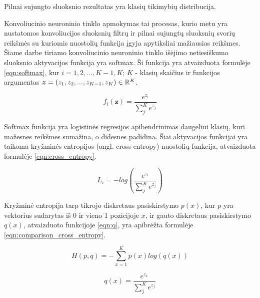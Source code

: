 Pilnai sujungto sluoksnio rezultatas yra klasių tikimybių distribucija.

Konvoliucinio neuroninio tinklo apmokymas tai procesas, kurio metu yra nustatomos konvoliucijos sluoksnių filtrų ir pilnai sujungtų sluoksnių svorių reikšmės su kuriomis nuostolių funkcija įgyja apytiksliai mažiausias reikšmes. Šiame darbe tiriamo konvoliucinio neuroninio tinklo išėjimo netiesiškumo sluoksnio aktyvacijos funkcija yra softmax. Ši funkcija yra atvaizduota formulėje \ref{eqn:softmax}, kur $i = 1, 2, ..., K - 1, K$; $K$ - klasių skaičius ir funkcijos argumentas $\boldsymbol{z} = (z_1, z_2, ..., z_{K - 1}, z_K) \in \mathbb{R}^K$.

\begin{equation}
\label{eqn:softmax}
	f_i(\boldsymbol{z}) = \dfrac{e^{z_i}}{\sum_{j}^{K} e^{z_j}}
\end{equation}

Softmax funkcija yra logistinės regresijos apibendrinimas daugeliui klasių, kuri mažesnes reikšmes sumažina, o didesnes padidina. Šiai aktyvacijos funkcijai yra taikoma kryžminės entropijos (angl. cross-entropy) nuostolių funkcija, atvaizduota formulėje \ref{eqn:cross_entropy}.

\begin{equation}
\label{eqn:cross_entropy}
	L_i = - log(\dfrac{e^{z_i}}{\sum_{j}^{K} e^{z_j}})
\end{equation}

Kryžminė entropija tarp tikrojo diskretaus pasiskirstymo $p(x)$, kur $p$ yra vektorius sudarytas iš 0 ir vieno 1 pozicijoje $x$, ir gauto diskretaus pasiskirstymo $q(x)$, atvaizduoto funkcijoje \ref{eqn:q}, yra apibrėžta formulėje \ref{eqn:comparison_cross_entropy}.

\begin{equation}
\label{eqn:comparison_cross_entropy}
	H(p, q) = - \sum_{x = 1}^K p(x) log(q(x))
\end{equation}

\begin{equation}
\label{eqn:q}
	q(x) = \dfrac{e^{z_x}}{\sum_{j}^{K} e^{z_j}}
\end{equation}
